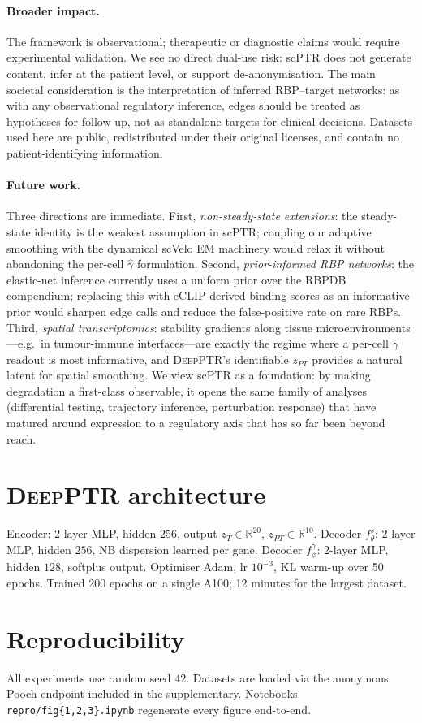 \documentclass{article}
\begin{document}
\paragraph{Broader impact.} The framework is observational; therapeutic
or diagnostic claims would require experimental validation. We see no
direct dual-use risk: scPTR does not generate content, infer at the
patient level, or support de-anonymisation. The main societal
consideration is the interpretation of inferred RBP--target networks: as
with any observational regulatory inference, edges should be treated as
hypotheses for follow-up, not as standalone targets for clinical
decisions. Datasets used here are public, redistributed under their
original licenses, and contain no patient-identifying information.

\paragraph{Future work.} Three directions are immediate. First,
\emph{non-steady-state extensions}: the steady-state identity is the
weakest assumption in scPTR; coupling our adaptive smoothing with the
dynamical scVelo EM machinery would relax it without abandoning the
per-cell $\widehat\gamma$ formulation. Second, \emph{prior-informed RBP
networks}: the elastic-net inference currently uses a uniform prior over
the RBPDB compendium; replacing this with eCLIP-derived
\citep{vannostrand2020} binding scores as an informative prior would
sharpen edge calls and reduce the false-positive rate on rare RBPs.
Third, \emph{spatial transcriptomics}: stability gradients along tissue
microenvironments---e.g.\ in tumour-immune interfaces---are exactly the
regime where a per-cell $\gamma$ readout is most informative, and
\textsc{DeepPTR}'s identifiable $z_{PT}$ provides a natural latent for
spatial smoothing. We view scPTR as a foundation: by making degradation
a first-class observable, it opens the same family of analyses
(differential testing, trajectory inference, perturbation response)
that have matured around expression to a regulatory axis that has so far
been beyond reach.




\appendix
\section{\textsc{DeepPTR} architecture}
\label{app:deepptr}
Encoder: 2-layer MLP, hidden $256$, output $z_T{\in}\mathbb R^{20}$,
$z_{PT}{\in}\mathbb R^{10}$. Decoder $f^s_\theta$: 2-layer MLP, hidden $256$,
NB dispersion learned per gene. Decoder $f^\gamma_\phi$: 2-layer MLP,
hidden $128$, softplus output. Optimiser Adam, lr $10^{-3}$, KL warm-up
over 50 epochs. Trained 200 epochs on a single A100; 12 minutes for
the largest dataset.

\section{Reproducibility}
All experiments use random seed $42$. Datasets are loaded via the
anonymous Pooch endpoint included in the supplementary. Notebooks
\texttt{repro/fig\{1,2,3\}.ipynb} regenerate every figure end-to-end.


\end{document}
